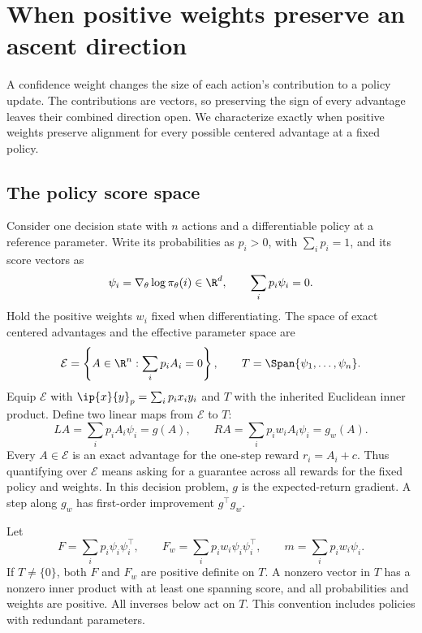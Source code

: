\section{When positive weights preserve an ascent direction}
\label{sec:weighting}

A confidence weight changes the size of each action's contribution to a policy update. The contributions are vectors, so preserving the sign of every advantage leaves their combined direction open. We characterize exactly when positive weights preserve alignment for every possible centered advantage at a fixed policy.

\subsection{The policy score space}

Consider one decision state with $n$ actions and a differentiable policy at a reference parameter. Write its probabilities as $p_i>0$, with $\sum_i p_i=1$, and its score vectors as
\[
\psi_i=\nabla_\theta\log\pi_\theta(i)\in\R^d,
\qquad \sum_i p_i\psi_i=0.
\]
Hold the positive weights $w_i$ fixed when differentiating. The space of exact centered advantages and the effective parameter space are
\[
\mathcal E=\left\{A\in\R^n:\sum_i p_iA_i=0\right\},
\qquad T=\Span\{\psi_1,\ldots,\psi_n\}.
\]
Equip $\mathcal E$ with $\ip{x}{y}_p=\sum_i p_ix_iy_i$ and $T$ with the inherited Euclidean inner product. Define two linear maps from $\mathcal E$ to $T$:
\begin{equation}
LA=\sum_i p_iA_i\psi_i=g(A),\qquad
RA=\sum_i p_iw_iA_i\psi_i=g_w(A).
\label{eq:gradient-maps}
\end{equation}
Every $A\in\mathcal E$ is an exact advantage for the one-step reward $r_i=A_i+c$. Thus quantifying over $\mathcal E$ means asking for a guarantee across all rewards for the fixed policy and weights. In this decision problem, $g$ is the expected-return gradient. A step along $g_w$ has first-order improvement $g^\top g_w$.

Let
\begin{equation}
F=\sum_i p_i\psi_i\psi_i^\top,\qquad
F_w=\sum_i p_iw_i\psi_i\psi_i^\top,\qquad
m=\sum_i p_iw_i\psi_i.
\label{eq:fisher-matrices}
\end{equation}
If $T\ne\{0\}$, both $F$ and $F_w$ are positive definite on $T$. A nonzero vector in $T$ has a nonzero inner product with at least one spanning score, and all probabilities and weights are positive. All inverses below act on $T$. This convention includes policies with redundant parameters.

